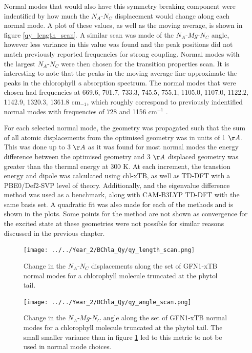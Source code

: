 Normal modes that would also have this symmetry breaking component were indentified
by how much the $N_A$-$N_C$ displacement would change along each normal mode. A plot of these
values, as well as the moving average, is shown in figure \ref{qy_length_scan}.
A similar scan was made of the $N_A$-$Mg$-$N_C$ angle, however less variance in
this value was found and the peak positions did not match previously reported frequencies
for strong coupling. Normal modes with the largest $N_A$-$N_C$ were then chosen 
for the transition properties scan.  It is interesting to note that the peaks in
the moving average line approximate the peaks in the chlorophyll \emph{a} absorption 
spectrum. The normal modes that were chosen had frequencies at 669.6, 701.7, 733.3,
745.5, 755.1, 1105.0, 1107.0, 1122.2, 1142.9, 1320.3, 1361.8 $\text{cm}_{-1}$, which
roughly correspond to previously indentified normal modes with frequencies of 728
and 1156 $\text{cm}^{-1}$ \cite{Kim2020}.

For each selected normal mode, the geometry was propagated such that the sum of
all atomic displacements from the optimised geometry was in units of 1 $\AA{}$.
This was done up to 3 $\AA{}$ as it was found for most normal modes the energy 
difference between the optimised geometry and 3 $\AA{}$ displaced geometry was greater
than the thermal energy at 300 K. At each increment, the \Qy transtion energy and
dipole was calculated using chl-xTB, as well as TD-DFT with a PBE0/Def2-SVP level
of theory. Additionally, \dscf and the eigenvalue difference method was used as 
a benchmark, along with CAM-B3LYP TD-DFT with the same basis set. A quadratic
fit was also made for each of the methods and is shown in the plots. Some points
for the \dscf method are not shown as convergence for the excited state at these
geometries were not possible for similar reasons discussed in the previous chapter.

\begin{figure}
    \centering
    \texttt{[image: ../../Year\_2/BChla\_Qy/qy\_length\_scan.png]}
    \label{fig:qy_length_scan}
    \caption{Change in the $N_A$-$N_C$ displacements along the set of GFN1-xTB 
    normal modes for a chlorophyll molecule truncated at the phytol tail.}
\end{figure}

\begin{figure}
    \centering
    \texttt{[image: ../../Year\_2/BChla\_Qy/qy\_angle\_scan.png]}
    \label{fig:qy_angle_scan}
    \caption{Change in the $N_A$-$Mg$-$N_C$ angle along the set of GFN1-xTB normal
    modes for a chlorophyll molecule truncated at the phytol tail. The small smaller
    variance than in figure \ref{fig:qy_length_scan} led to this metric to not be
    used in normal mode choices.}
\end{figure}

